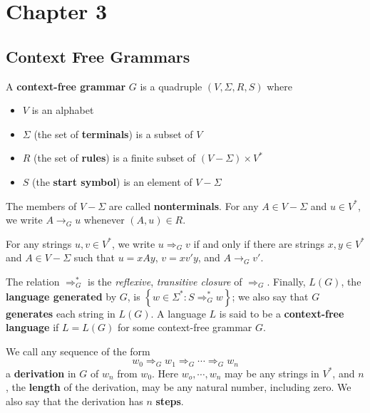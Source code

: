 \section{Chapter 3}

\begin{multicols}{2}
\setlength{\columnsep}{1.5cm}
\setlength{\columnseprule}{0.2pt}

\subsection{Context Free Grammars}

\begin{definition}{}
  A \textbf{context-free grammar} $G$ is a quadruple $(V, \Sigma, R, S)$ where
  \begin{itemize}
    \item $V$ is an alphabet
    \item $\Sigma$ (the set of \textbf{terminals}) is a subset of $V$
    \item $R$ (the set of \textbf{rules}) is a finite subset of $(V - \Sigma) \times V^*$
    \item $S$ (the \textbf{start symbol}) is an element of $V - \Sigma$
  \end{itemize}
\end{definition}

The members of $V - \Sigma$ are called \textbf{nonterminals}. For any $A \in V - \Sigma$ and $u \in V^*$, we write $A \rightarrow_G u$ whenever $(A, u) \in R$. 
  
For any strings $u, v \in V^*$, we write $u \Rightarrow_G v$ if and only if there are strings $x, y \in V^*$ and $A \in V - \Sigma$ such that $u = xAy$, $v = xv'y$, and $A \rightarrow_G v'$. 

The relation $\Rightarrow_G^*$ is the \textit{reflexive}, \textit{transitive closure} of $\Rightarrow_G$. Finally, $L(G)$, the \textbf{language generated} by $G$, is $\left\{ w \in \Sigma^* : S \Rightarrow_G^* w \right\}$; we also say that $G$ \textbf{generates} each string in $L(G)$. A language $L$ is said to be a \textbf{context-free language} if $L = L(G)$ for some context-free grammar $G$.

We call any sequence of the form
\begin{equation*}
  w_0 \Rightarrow_G w_1 \Rightarrow_G \cdots \Rightarrow_G w_n
\end{equation*}
a \textbf{derivation} in $G$ of $w_n$ from $w_0$. Here $w_o, \cdots, w_n$ may be any strings in $V^*$, and $n$, the \textbf{length} of the derivation, may be any natural number, including zero. We also say that the derivation has $n$ \textbf{steps}. 

\end{multicols}

